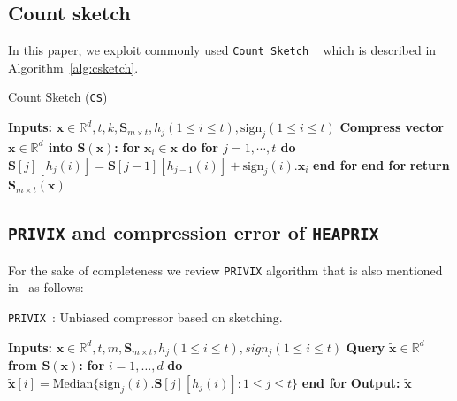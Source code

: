 \documentclass{article}
\begin{document}
\subsection{Count sketch}
 In this paper, we exploit commonly used \texttt{Count Sketch} ~\citep{DBLP:journals/tcs/CharikarCF04} which is described in Algorithm~\ref{alg:csketch}.
 \begin{algorithm}[b]
\caption{Count Sketch ({\texttt{CS})~\citep{DBLP:journals/tcs/CharikarCF04}} }\label{alg:csketch}
 \begin{algorithmic}[1]
\STATE \textbf{Inputs:} $\boldsymbol{x}\in\mathbb{R}^{d}, t, k, \mathbf{S}_{m\times t}, h_j (1\leq i\leq t), \text{sign}_j (1\leq i\leq t)$
 \STATE \textbf{Compress vector $\boldsymbol{x}\in\mathbb{R}^{d}$ into $\mathbf{S}\left(\boldsymbol{x}\right)$:}
 \STATE \textbf{for} $\boldsymbol{x}_i\in\boldsymbol{x}$ \textbf{do}
 \STATE \quad\textbf{for $j=1,\cdots,t$ do}
 \STATE \quad\quad $\mathbf{S}[j][h_j(i)]=\mathbf{S}[j-1][h_{j-1}(i)]+\text{sign}_j(i).\boldsymbol{x}_i$ 
 \STATE \quad\textbf{end for}
 \STATE \textbf{end for}
 \STATE \textbf{return} $\mathbf{S}_{m\times t}(\boldsymbol{x})$
 \end{algorithmic}
 \end{algorithm}

\subsection{\texttt{PRIVIX} and compression error of \texttt{HEAPRIX}}
For the sake of completeness we review \texttt{PRIVIX} algorithm that is also mentioned in~\citet{li2019privacy} as follows:

\begin{algorithm}[H]
\caption{\texttt{PRIVIX}~\citep{li2019privacy}: Unbiased compressor based on sketching. }\label{Alg:privix}
\begin{algorithmic}[1]
\STATE \textbf{Inputs:} $\boldsymbol{x}\in\mathbb{R}^{d}, t, m, \mathbf{S}_{m\times t}, h_j (1\leq i\leq t), sign_j (1\leq i\leq t)$
\STATE \textbf{Query} $\tilde{\boldsymbol{x}}\in\mathbb{R}^d$ \textbf{from $\mathbf{S(\boldsymbol{x})}$:}
\STATE \textbf{for} $i=1,\ldots,d$ \textbf{do}
\STATE \quad\quad ${\tilde{\boldsymbol{x}}}[i]=\text{Median}\{\text{sign}_j(i).\mathbf{S}[j][h_j(i)]:1\leq j\leq t\}$ 
\STATE \textbf{end for}
\STATE \textbf{Output:} ${\tilde{\boldsymbol{x}}}$
\vspace{- 0.1cm}
\end{algorithmic}
\end{algorithm}
\end{document}
